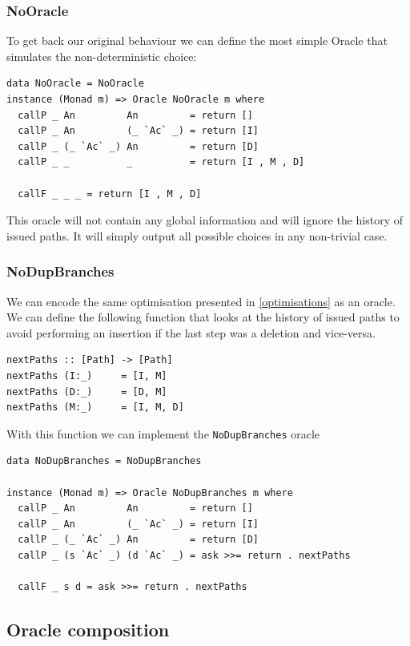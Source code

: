 \documentclass[11pt, titlepage]{article}
\begin{document}
 \subsubsection{NoOracle}
To get back our original behaviour we can define the most simple Oracle that simulates the non-deterministic
choice:

\begin{verbatim}
data NoOracle = NoOracle
instance (Monad m) => Oracle NoOracle m where
  callP _ An         An         = return []
  callP _ An         (_ `Ac` _) = return [I]
  callP _ (_ `Ac` _) An         = return [D]
  callP _ _          _          = return [I , M , D]

  callF _ _ _ = return [I , M , D]
\end{verbatim}

This oracle will not contain any global information and will ignore the history 
of issued paths. It will simply output all possible choices in any non-trivial 
case.

\subsubsection{NoDupBranches}
We can encode the same optimisation presented in \ref{optimisations} as an oracle. We can 
define the following function that looks at the history of issued paths to avoid 
performing an insertion if the last step was a deletion and vice-versa.

\begin{verbatim}
nextPaths :: [Path] -> [Path]
nextPaths (I:_)     = [I, M]
nextPaths (D:_)     = [D, M]
nextPaths (M:_)     = [I, M, D]
\end{verbatim}

With this function we can implement the \texttt{NoDupBranches} oracle

\begin{verbatim}
data NoDupBranches = NoDupBranches

instance (Monad m) => Oracle NoDupBranches m where
  callP _ An         An         = return []
  callP _ An         (_ `Ac` _) = return [I]
  callP _ (_ `Ac` _) An         = return [D]
  callP _ (s `Ac` _) (d `Ac` _) = ask >>= return . nextPaths

  callF _ s d = ask >>= return . nextPaths
\end{verbatim}

\subsection{Oracle composition}
\end{document}
